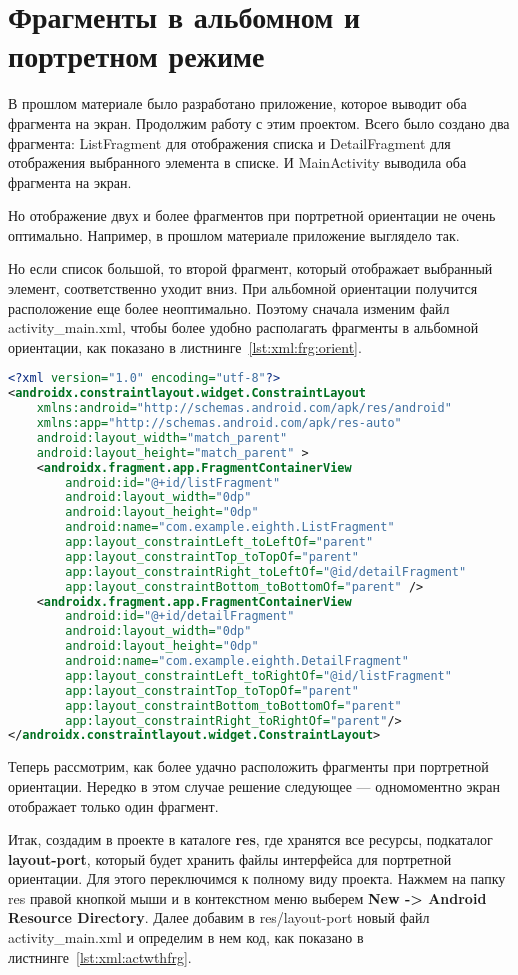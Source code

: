 \section{Фрагменты в альбомном и портретном режиме}
В прошлом материале было разработано приложение, которое выводит оба
фрагмента на экран. Продолжим работу с этим проектом. Всего было создано
два фрагмента: ListFragment для отображения списка и DetailFragment для
отображения выбранного элемента в списке. И MainActivity выводила оба
фрагмента на экран.\par
Но отображение двух и более фрагментов при портретной ориентации не
очень оптимально. Например, в прошлом материале приложение выглядело
так.\par
Но если список большой, то второй фрагмент, который отображает
выбранный элемент, соответственно уходит вниз. При альбомной
ориентации получится расположение еще более неоптимально. Поэтому
сначала изменим файл activity\_main.xml, чтобы более удобно располагать
фрагменты в альбомной ориентации, как показано
в листнинге~\ref{lst:xml:frg:orient}.

\begin{lstlisting}[language=XML
	, caption=\leftline{}
	, label=lst:xml:frg:orient
	]
<?xml version="1.0" encoding="utf-8"?>
<androidx.constraintlayout.widget.ConstraintLayout
    xmlns:android="http://schemas.android.com/apk/res/android"
    xmlns:app="http://schemas.android.com/apk/res-auto"
    android:layout_width="match_parent"
    android:layout_height="match_parent" >
    <androidx.fragment.app.FragmentContainerView
        android:id="@+id/listFragment"
		android:layout_width="0dp"
		android:layout_height="0dp"
		android:name="com.example.eighth.ListFragment"
		app:layout_constraintLeft_toLeftOf="parent"
		app:layout_constraintTop_toTopOf="parent"
		app:layout_constraintRight_toLeftOf="@id/detailFragment"
		app:layout_constraintBottom_toBottomOf="parent" />
    <androidx.fragment.app.FragmentContainerView
        android:id="@+id/detailFragment"
        android:layout_width="0dp"
        android:layout_height="0dp"
        android:name="com.example.eighth.DetailFragment"
        app:layout_constraintLeft_toRightOf="@id/listFragment"
        app:layout_constraintTop_toTopOf="parent"
        app:layout_constraintBottom_toBottomOf="parent"
        app:layout_constraintRight_toRightOf="parent"/>
</androidx.constraintlayout.widget.ConstraintLayout>
\end{lstlisting}

Теперь рассмотрим, как более удачно расположить фрагменты при
портретной ориентации. Нередко в этом случае решение следующее ---
одномоментно экран отображает только один фрагмент.\par
Итак, создадим в проекте в каталоге \textbf{res}, где хранятся все ресурсы,
подкаталог \textbf{layout-port}, который будет хранить файлы интерфейса
для портретной ориентации. Для этого переключимся к полному виду проекта.
Нажмем на папку res правой кнопкой мыши и в контекстном меню выберем
\textbf{New -> Android Resource Directory}.
Далее добавим в res/layout-port новый файл activity\_main.xml и определим в
нем код, как показано в листнинге~\ref{lst:xml:actwthfrg}.

